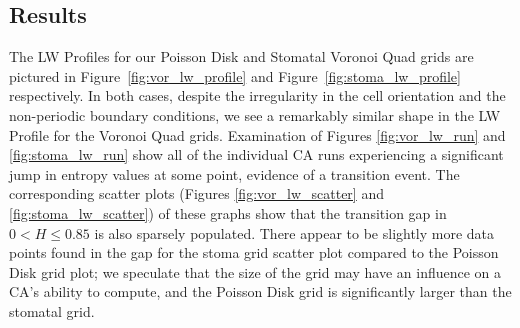 \documentclass[a4paper,11pt]{article}
\begin{document}

\subsection*{Results}

The LW Profiles for our Poisson Disk and Stomatal Voronoi Quad grids are pictured in Figure~\ref{fig:vor_lw_profile} and Figure~\ref{fig:stoma_lw_profile} respectively. In both cases, despite the irregularity in the cell orientation and the non-periodic boundary conditions, we see a remarkably similar shape in the LW Profile for the Voronoi Quad grids. Examination of Figures \ref{fig:vor_lw_run} and \ref{fig:stoma_lw_run} show all of the individual CA runs experiencing a significant jump in entropy values at some point, evidence of a transition event. The corresponding scatter plots (Figures \ref{fig:vor_lw_scatter} and \ref{fig:stoma_lw_scatter}) of these graphs show that the transition gap in $0 < H \le 0.85$ is also sparsely populated. There appear to be slightly more data points found in the gap for the stoma grid scatter plot compared to the Poisson Disk grid plot; we speculate that the size of the grid may have an influence on a CA's ability to compute, and the Poisson Disk grid is significantly larger than the stomatal grid.
\end{document}
